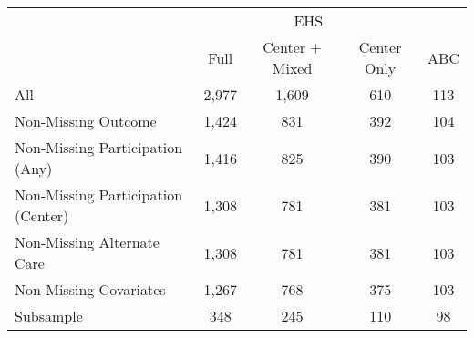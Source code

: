 \begin{tabular}{lcccc}
\toprule 
\midrule 
 & \multicolumn{3}{c}{EHS} &  \\
 \cmidrule(lr){2-4} 
 & Full & Center $+$ Mixed & Center Only & ABC \\
\midrule 
All & 2,977 & 1,609 & 610 & 113 \\
Non-Missing Outcome & 1,424 & 831 & 392 & 104 \\
Non-Missing Participation (Any) & 1,416 & 825 & 390 & 103 \\
Non-Missing Participation (Center) & 1,308 & 781 & 381 & 103 \\
Non-Missing Alternate Care & 1,308 & 781 & 381 & 103 \\
Non-Missing Covariates & 1,267 & 768 & 375 & 103 \\
Subsample & 348 & 245 & 110 & 98 \\
\midrule 
\bottomrule 
\end{tabular}
